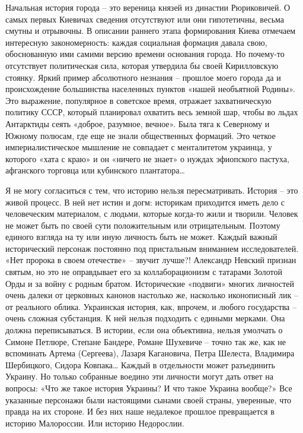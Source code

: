 Начальная история города – это вереница князей из династии Рюриковичей. О самых
первых Киевичах сведения отсутствуют или они гипотетичны, весьма смутны и
отрывочны. В описании раннего этапа формирования Киева отмечаем интересную
закономерность: каждая социальная формация давала свою, обоснованную ими самими
версию времени основания города. Но почему-то отсутствует политическая сила,
которая утвердила бы своей Кирилловскую стоянку. Яркий пример абсолютного
незнания – прошлое моего города да и происхождение большинства населенных
пунктов «нашей необъятной Родины». Это выражение, популярное в советское время,
отражает захватническую политику СССР, который планировал охватить весь земной
шар, чтобы во льдах Антарктиды сеять «доброе, разумное, вечное». Была тяга к
Северному и Южному полюсам, где еще не знали общественных формаций. Это четкое
империалистическое мышление не совпадает с менталитетом украинца, у которого
«хата с краю» и он «ничего не знает» о нуждах эфиопского пастуха, афганского
торговца или кубинского плантатора…

Я не могу согласиться с тем, что историю нельзя пересматривать. История – это
живой процесс. В ней нет истин и догм: историкам приходится иметь дело с
человеческим материалом, с людьми, которые когда-то жили и творили. Человек не
может быть по своей сути положительным или отрицательным. Поэтому единого
взгляда на ту или иную личность быть не может. Каждый важный исторический
персонаж постоянно под пристальным вниманием исследователей. «Нет пророка в
своем отечестве» – звучит лучше?! Александр Невский признан святым, но это не
оправдывает его за коллаборационизм с татарами Золотой Орды и за войну с родным
братом. Исторические «подвиги» многих личностей очень далеки от церковных
канонов настолько же, насколько иконописный лик – от реального облика.
Украинская история, как, впрочем, и любого государства – очень сложная
субстанция. К ней нельзя подходить с едиными мерками. Она должна
переписываться. В истории, если она объективна, нельзя умолчать о Симоне
Петлюре, Степане Бандере, Романе Шухевиче – точно так же, как не вспоминать
Артема (Сергеева), Лазаря Кагановича, Петра Шелеста, Владимира Шербицкого,
Сидора Ковпака… Каждый в отдельности может разъединить Украину. Но только
собранные воедино эти личности могут дать ответ на вопросы: «Что же такое
история Украины? И что такое Украина вообще?» Все указанные персонажи были
настоящими сынами своей страны, уверенные, что правда на их стороне. И без них
наше недалекое прошлое превращается в историю Малороссии. Или историю
Недорослии.

